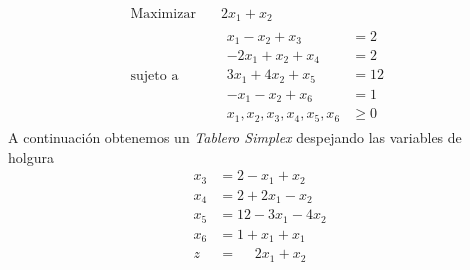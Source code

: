 \documentclass{article}
\begin{document}
\begin{equation*}
  \begin{aligned}
    \text{Maximizar} \quad & 2x_{1}+x_{2}\\
    \text{sujeto a} \quad &
    \begin{aligned}
      x_{1}-x_{2}+x_{3}& =2\\
      -2x_{1}+x_{2}+x_{4}& =2\\
      3x_{1}+4x_{2}+x_{5}& =12\\
      -x_{1}-x_{2}+x_{6}  & =1\\
      x_{1},x_{2},x_3,x_4,x_5,x_6  &\geq 0
    \end{aligned}
  \end{aligned}
\end{equation*}
A continuación obtenemos un \emph{Tablero Simplex} despejando las
variables de holgura
\begin{equation*}
    \begin{aligned}
      x_{3}&=2-x_{1}+x_{2}\\
      x_{4}&=2+2x_{1}-x_{2}\\
      x_{5}&=12-3x_{1}-4x_{2}\\
      x_{6}&=1+x_{1}+x_{1}\\
      \hline
      z&=\phantom{-1}2x_{1}+x_{2}
    \end{aligned}
\end{equation*}
\end{document}
